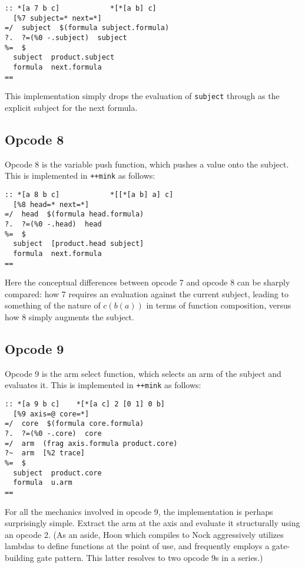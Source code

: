 \documentclass[twoside]{article}
\begin{document}
\begin{lstlisting}[style=listingcode]
:: *[a 7 b c]            *[*[a b] c]
  [%7 subject=* next=*]
=/  subject  $(formula subject.formula)
?.  ?=(%0 -.subject)  subject
%=  $
  subject  product.subject
  formula  next.formula
==
\end{lstlisting}

\noindent
This implementation simply drops the evaluation of \lstinline[style=inlinecode]{subject} through as the explicit subject for the next formula.

\subsection{Opcode 8}

Opcode 8 is the variable push function, which pushes a value onto the subject.  This is implemented in \lstinline[style=inlinecode]{++mink} as follows:

\begin{lstlisting}[style=listingcode]
:: *[a 8 b c]            *[[*[a b] a] c]
  [%8 head=* next=*]
=/  head  $(formula head.formula)
?.  ?=(%0 -.head)  head
%=  $
  subject  [product.head subject]
  formula  next.formula
==
\end{lstlisting}

\noindent
Here the conceptual differences between opcode 7 and opcode 8 can be sharply compared:  how 7 requires an evaluation against the current subject, leading to something of the nature of $c(b(a))$ in terms of function composition, versus how 8 simply augments the subject.

\subsection{Opcode 9}

Opcode 9 is the arm select function, which selects an arm of the subject and evaluates it.  This is implemented in \lstinline[style=inlinecode]{++mink} as follows:

\begin{lstlisting}[style=listingcode]
:: *[a 9 b c]    *[*[a c] 2 [0 1] 0 b]
  [%9 axis=@ core=*]
=/  core  $(formula core.formula)
?.  ?=(%0 -.core)  core
=/  arm  (frag axis.formula product.core)
?~  arm  [%2 trace]
%=  $
  subject  product.core
  formula  u.arm
==
\end{lstlisting}

\noindent
For all the mechanics involved in opcode 9, the implementation is perhaps surprisingly simple.  Extract the arm at the axis and evaluate it structurally using an opcode 2.  (As an aside, Hoon which compiles to Nock aggressively utilizes lambdas to define functions at the point of use, and frequently employs a gate-building gate pattern.  This latter resolves to two opcode 9s in a series.)
\end{document}
